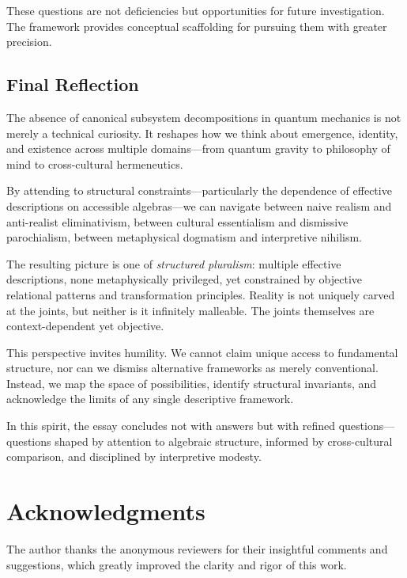 \documentclass[11pt,a4paper]{article}
\begin{document}
These questions are not deficiencies but opportunities for future investigation. The framework provides conceptual scaffolding for pursuing them with greater precision.

\subsection{Final Reflection}

The absence of canonical subsystem decompositions in quantum mechanics is not merely a technical curiosity. It reshapes how we think about emergence, identity, and existence across multiple domains—from quantum gravity to philosophy of mind to cross-cultural hermeneutics.

By attending to structural constraints—particularly the dependence of effective descriptions on accessible algebras—we can navigate between naive realism and anti-realist eliminativism, between cultural essentialism and dismissive parochialism, between metaphysical dogmatism and interpretive nihilism.

The resulting picture is one of \emph{structured pluralism}: multiple effective descriptions, none metaphysically privileged, yet constrained by objective relational patterns and transformation principles. Reality is not uniquely carved at the joints, but neither is it infinitely malleable. The joints themselves are context-dependent yet objective.

This perspective invites humility. We cannot claim unique access to fundamental structure, nor can we dismiss alternative frameworks as merely conventional. Instead, we map the space of possibilities, identify structural invariants, and acknowledge the limits of any single descriptive framework.

In this spirit, the essay concludes not with answers but with refined questions—questions shaped by attention to algebraic structure, informed by cross-cultural comparison, and disciplined by interpretive modesty.

\section*{Acknowledgments}

The author thanks the anonymous reviewers for their insightful comments and suggestions, which greatly improved the clarity and rigor of this work.
\end{document}
